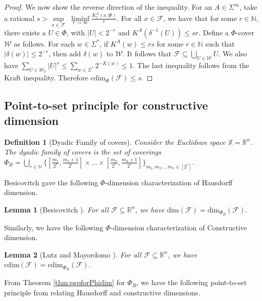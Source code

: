 \documentclass[11pt]{article}
\newtheorem{lemma}{Lemma}
\newtheorem{definition}{Definition}
\newcommand{\N}{\mathbb{N}}
\newcommand{\R}{\mathbb{R}}
\newcommand{\cdim}{\mathrm{cdim}}
\renewcommand{\dim}{{\mathrm{dim}}}
\newcommand{\F}{{\mathcal{F}}}
\newcommand{\X}{{\mathbb{X}}}
\newcommand{\UU}{{\mathcal{W}}}
\renewcommand{\F}{\mathcal{F}}
\newcommand{\x}{x}
\begin{document}
\begin{proof}
	\medskip
	
	We now show the reverse direction of the inequality.
	For an $A \in \Sigma^\infty$, take a rational $s > \sup\limits_{\x \in \mathcal{F}} \; \liminf\limits_{r \rightarrow \infty} \frac{K_r^A(\x, \Phi)}{r}$. For all $x \in \F$, we have that for some $r \in \N$, there exists a $U \in \Phi$, with $|U| < 2^{-r}$ and $K^A(\delta^{-1}(U)) \leq sr$. Define a $\Phi$-cover $\UU$ as follows. For each $w \in \Sigma^*$, if $K^A(w) \leq rs$ for some $r \in \N$ such that $ |\delta(w)| \leq 2^{-r}$, then add $\delta(w)$ to $\UU$.
	It follows that $\F \subseteq \bigcup_{U \in \UU} U $.
	We also have $\sum_{U \in \UU_k} |U|^s \leq \sum_{w \in \Sigma^*} 2^{-K(w)} \leq 1$. The last inequality follows from the Kraft inequality. Therefore $\cdim_{\Phi}(\F) \leq s$.
\end{proof}


\subsection{Point-to-set principle for constructive dimension}

\begin{definition} [Dyadic Family of covers] \label{def:dyadic_family}
	Consider the Euclidean space $\X = \R^n$. The dyadic family of covers is the set of coverings $\Phi_B = \bigcup_{r\in\N}  \{[\frac{m_1}{2^r}, \frac{m_1+1}{2^r}] \times \dots \times [\frac{m_n}{2^r}, \frac{m_n+1}{2^r}] \}_{m_1,m_2 \dots ,m_n \in [2^r]}$. 
\end{definition}

Besicovitch \cite{Besicovitch52} gave the following $\Phi$-dimension characterization of Hausdorff dimension. 

\begin{lemma}[Besicovitch \cite{Besicovitch52}] \label{thm:dimeqdimB}
	For all $\F \subseteq \R^n$, we have
	$\dim(\F) = \dim_{\Phi_B}(\F).$
\end{lemma}

Similarly, we have the following $\Phi$-dimension characterization of Constructive dimension. 

\begin{lemma} [Lutz and Mayordomo \cite{Lutz2008a}]\label{thm:cdimeqcdimB}
	For all $\F \subseteq \R^n$, we have
	$\cdim(\F) = \cdim_{\Phi_B}(\F).$
\end{lemma}

From Theorem \ref{thm:pspforPhidim} for $\Phi_B$, we have the following point-to-set principle from \cite{Lutz2018} relating Hausdorff and constructive dimensions. 
\end{document}
